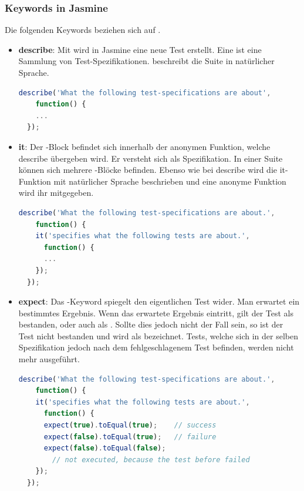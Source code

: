{\subsubsection{Keywords in Jasmine}
Die folgenden Keywords beziehen sich auf \cite[5-8]{Hahn:2013}.
\begin{itemize}
  \item \textbf{describe}:\newline
        Mit  wird in Jasmine eine neue Test  erstellt. Eine  ist eine Sammlung von Test-Spezifikationen.  beschreibt die Suite in natürlicher Sprache.
\begin{lstlisting}[language=JavaScript]
  describe('What the following test-specifications are about', 
    function() {
    ...
  });
\end{lstlisting}
  \item \textbf{it}:\newline
        Der -Block befindet sich innerhalb der anonymen Funktion, welche describe übergeben wird. Er versteht sich als Spezifikation. In einer Suite können sich mehrere -Blöcke befinden. Ebenso wie bei describe wird die it-Funktion mit natürlicher Sprache beschrieben und eine anonyme Funktion wird ihr mitgegeben.
\begin{lstlisting}[language=JavaScript]
  describe('What the following test-specifications are about.', 
    function() {
    it('specifies what the following tests are about.', 
      function() {
      ...
    });
  });
\end{lstlisting}
  \item \textbf{expect}:\newline
        Das -Keyword spiegelt den eigentlichen Test wider. Man erwartet ein bestimmtes Ergebnis. Wenn das erwartete Ergebnis eintritt, gilt der Test als bestanden, oder auch als . Sollte dies jedoch nicht der Fall sein, so ist der Test nicht bestanden und wird als  bezeichnet. Tests, welche sich in der selben Spezifikation jedoch nach dem fehlgeschlagenem Test befinden, werden nicht mehr ausgeführt.
\begin{lstlisting}[language=JavaScript]
  describe('What the following test-specifications are about.', 
    function() {
    it('specifies what the following tests are about.', 
      function() {
      expect(true).toEqual(true);    // success
      expect(false).toEqual(true);   // failure
      expect(false).toEqual(false);  
        // not executed, because the test before failed
    });
  });
\end{lstlisting}
\end{itemize}

}
